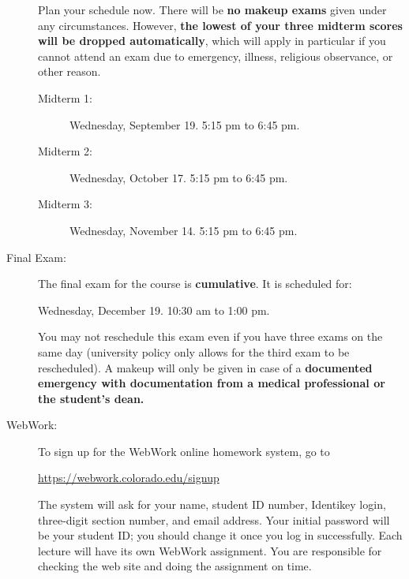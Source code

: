 \documentclass[11pt]{article}
\begin{document}
\begin{description}
  Plan your schedule now. There will be \textbf{no makeup exams} given
  under any circumstances. However, \textbf{the lowest of your three
    midterm scores will be dropped automatically}, which will apply in
  particular if you cannot attend an exam due to emergency, illness,
  religious observance, or other reason.
  \begin{description}
  \item[Midterm 1:] Wednesday, September 19. 5:15 pm to 6:45 pm.
  \item[Midterm 2:] Wednesday, October 17. 5:15 pm to 6:45 pm.
  \item[Midterm 3:] Wednesday, November 14. 5:15 pm to 6:45 pm.
  \end{description}

\item[Final Exam:] The final exam for the course is
  \textbf{cumulative}.  It is scheduled for:

  \begin{description}
  \item[Wednesday, December 19. 10:30 am to 1:00 pm.]
  \end{description}

  You may not reschedule this exam even if you have three exams on the
  same day (university policy only allows for the third exam to be
  rescheduled). A makeup will only be given in case of a
  \textbf{documented emergency with documentation from a medical
    professional or the student's dean.}

\item[WebWork:] To sign up for the WebWork online homework system, go
  to
  \begin{center}
    \url{https://webwork.colorado.edu/signup}
  \end{center}
  The system will ask for your name, student ID number, Identikey
  login, three-digit section number, and email address. Your initial
  password will be your student ID; you should change it once you log
  in successfully.  Each lecture will have its own WebWork
  assignment. You are responsible for checking the web site and doing
  the assignment on time.


\end{description}
\end{document}
